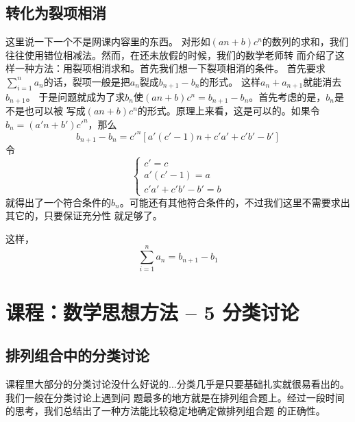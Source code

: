 \subsection{转化为裂项相消}
这里说一下一个不是网课内容里的东西。
对形如$(an + b)c^n$的数列的求和，我们往往使用错位相减法。然而，在还未放假的时候，我们的数学老师转
而介绍了这样一种方法：用裂项相消求和。首先我们想一下裂项相消的条件。
首先要求$\sum_{i=1}^{n}{a_n}$的话，裂项一般是把$a_n$裂成$b_{n+1} - b_n$的形式。
这样$a_n + a_{n+1}$就能消去$b_{n+1}$。
于是问题就成为了求$b_n$使$(an + b)c^n = b_{n+1} - b_n$。首先考虑的是，$b_n$是不是也可以被
写成$(an + b)c^n$的形式。原理上来看，这是可以的。如果令$b_n = (a'n + b')c'^n$，那么
\[
b_{n+1} - b_n = c'^n[a'(c'-1)n + c'a' + c'b' -b']
\]
令
\begin{equation}
\begin{cases}
c' = c\\
a'(c'-1) = a\\
c'a' + c'b' - b' = b
\end{cases}
\end{equation}
就得出了一个符合条件的$b_n$。可能还有其他符合条件的，不过我们这里不需要求出其它的，只要保证充分性
就足够了。

这样，
\begin{equation}
\sum_{i=1}^{n}{a_n} = b_{n+1} - {b_1}
\end{equation}

\section{课程：数学思想方法 -- 5 分类讨论}

\subsection{排列组合中的分类讨论}
课程里大部分的分类讨论没什么好说的...分类几乎是只要基础扎实就很易看出的。我们一般在分类讨论上遇到问
题最多的地方就是在排列组合题上。经过一段时间的思考，我们总结出了一种方法能比较稳定地确定做排列组合题
的正确性。

